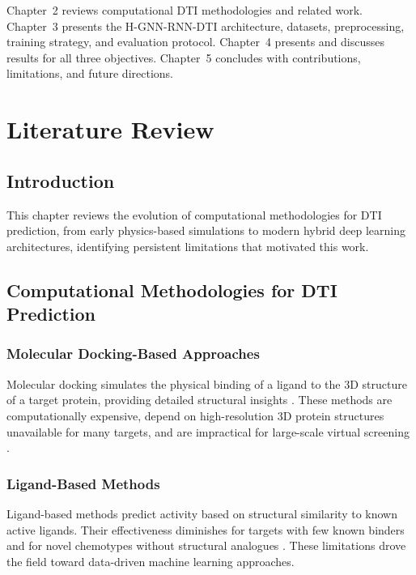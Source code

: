 \documentclass[12pt,a4paper,oneside]{report}
\begin{document}
Chapter~2 reviews computational DTI methodologies and related work. Chapter~3 presents the H-GNN-RNN-DTI architecture, datasets, preprocessing, training strategy, and evaluation protocol. Chapter~4 presents and discusses results for all three objectives. Chapter~5 concludes with contributions, limitations, and future directions.

\chapter{Literature Review}

\section{Introduction}

This chapter reviews the evolution of computational methodologies for DTI prediction, from early physics-based simulations to modern hybrid deep learning architectures, identifying persistent limitations that motivated this work.

\section{Computational Methodologies for DTI Prediction}

\subsection{Molecular Docking-Based Approaches}
Molecular docking simulates the physical binding of a ligand to the 3D structure of a target protein, providing detailed structural insights \citep{chen2024dti}. These methods are computationally expensive, depend on high-resolution 3D protein structures unavailable for many targets, and are impractical for large-scale virtual screening \citep{lu2025dtiam, dai2025}.

\subsection{Ligand-Based Methods}
Ligand-based methods predict activity based on structural similarity to known active ligands. Their effectiveness diminishes for targets with few known binders and for novel chemotypes without structural analogues \citep{lee2024dlm}. These limitations drove the field toward data-driven machine learning approaches.
\end{document}
